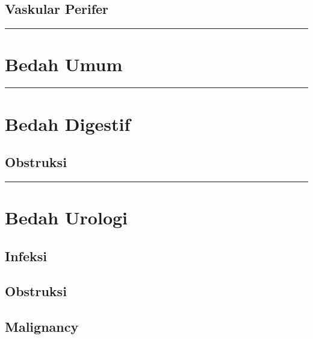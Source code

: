 \documentclass[
]{book}
\begin{document}
\hypertarget{vaskular-perifer}{%
\subsection{Vaskular Perifer}\label{vaskular-perifer}}

\begin{center}\rule{0.5\linewidth}{0.5pt}\end{center}

\hypertarget{bedah-umum-1}{%
\section{Bedah Umum}\label{bedah-umum-1}}

\begin{center}\rule{0.5\linewidth}{0.5pt}\end{center}

\hypertarget{bedah-digestif-1}{%
\section{Bedah Digestif}\label{bedah-digestif-1}}

\hypertarget{obstruksi-1}{%
\subsection{Obstruksi}\label{obstruksi-1}}

\begin{center}\rule{0.5\linewidth}{0.5pt}\end{center}

\hypertarget{bedah-urologi}{%
\section{Bedah Urologi}\label{bedah-urologi}}

\hypertarget{infeksi-3}{%
\subsection{Infeksi}\label{infeksi-3}}

\hypertarget{obstruksi-2}{%
\subsection{Obstruksi}\label{obstruksi-2}}

\hypertarget{malignancy-1}{%
\subsection{Malignancy}\label{malignancy-1}}
\end{document}
